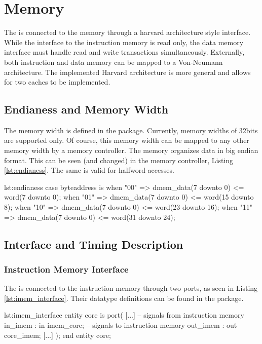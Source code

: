 \chapter{Memory}

The \procname is connected to the memory through a harvard architecture style interface.
While the interface to the instruction memory is read only, the data memory interface must handle read and write transactions simultaneously.
Externally, both instruction and data memory can be mapped to a Von-Neumann architecture.
The implemented Harvard architecture is more general and allows for two caches to be implemented.

\section{Endianess and Memory Width}
The memory width is defined in the  package.
Currently, memory widths of 32bits are supported only.
Of course, this memory width can be mapped to any other memory width by a memory controller.
The memory organizes data in big endian format.
This can be seen (and changed) in the memory controller, Listing \ref{lst:endianess}.
The same is valid for halfword-accesses.

\begin{vhdl}{lst:endianess}
case byteaddress is
when "00" =>
	dmem_data(7 downto 0) <= word(7 downto 0);
when "01" =>
	dmem_data(7 downto 0) <= word(15 downto 8);
when "10" =>
	dmem_data(7 downto 0) <= word(23 downto 16);
when "11" =>
	dmem_data(7 downto 0) <= word(31 downto 24);
\end{vhdl}

\section{Interface and Timing Description}
\subsection{Instruction Memory Interface}
The \procname is connected to the instruction memory through two ports, as seen in Listing \ref{lst:imem_interface}.
Their datatype definitions can be found in the  package.
\begin{vhdl}{lst:imem_interface}
entity core is
port(
	[...]
	-- signals from instruction memory
	in_imem   : in  imem_core;
	-- signals to instruction memory
	out_imem  : out core_imem;
	[...]
);
end entity core;
\end{vhdl}

